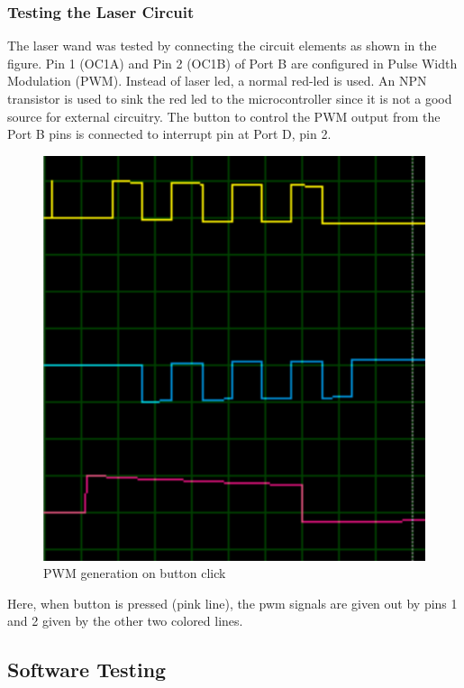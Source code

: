 \documentclass[12pt, a4paper]{article}
\begin{document}
\subsubsection{Testing the Laser Circuit}

The laser wand was tested by connecting the circuit elements as shown in the figure. Pin 1 (OC1A) and Pin 2 (OC1B) of Port B are configured in Pulse Width Modulation (PWM). Instead of laser led, a normal red-led is used. An NPN transistor is used to sink the red led to the microcontroller since it is not a good source for external circuitry. The button to control the PWM output from the Port B pins is connected to interrupt pin at Port D, pin 2.

\begin{figure}[htp]
\centering
\includegraphics[scale=0.30]{afterpress.png}
\caption{PWM generation on button click}
\label{}
\end{figure}

Here, when button is pressed (pink line), the pwm signals are given out by pins 1 and 2 given by the other two colored lines. 

\subsection{Software Testing}
\end{document}
